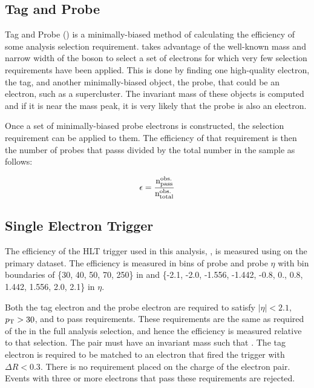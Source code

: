 \subsection{Tag and Probe}

Tag and Probe (\TnP) is a minimally-biased method of calculating the efficiency
of some analysis selection requirement. \TnP takes advantage of the well-known
mass and narrow width of the \Z boson to select a set of electrons for which
very few selection requirements have been applied. This is done by finding one
high-quality electron, the tag, and another minimally-biased object, the probe,
that could be an electron, such as a supercluster. The invariant mass of these
objects is computed and if it is near the \Z mass peak, it is very likely that
the probe is also an electron.

Once a set of minimally-biased probe electrons is constructed, the selection
requirement can be applied to them. The efficiency of that requirement is then
the number of probes that passs divided by the total number in the sample as
follows:

\begin{equation}
    \label{eq:eff}
    \epsilon = \frac{
        \text{n}^{\text{obs.}}_{\text{pass}}
    }{
        \text{n}^{\text{obs.}}_{\text{total}}
    }
\end{equation}

\subsection{Single Electron Trigger}
\label{ssec:sf_trigger}

The efficiency of the HLT trigger used in this analysis,
\SingleElectronTrigger, is measured using \TnP on the primary dataset. The
efficiency is measured in bins of probe \pt and probe $\eta$ with bin
boundaries of \{30, 40, 50, 70, 250\} in \pt and \{-2.1, -2.0, -1.556, -1.442,
-0.8, 0., 0.8, 1.442, 1.556, 2.0, 2.1\} in $\eta$.

Both the tag electron and the probe electron are required to satisfy $|\eta| <
2.1$, $p_{\mathrm{T}} > 30$, and to pass \EGTIGHT requirements. These requirements are the
same as required of the \CentralElectron in the full analysis selection, and
hence the efficiency is measured relative to that selection. The pair must have
an invariant mass such that \MassRange. The tag electron is required to be
matched to an electron that fired the trigger with $\Delta R < 0.3$. There is
no requirement placed on the charge of the electron pair. Events with three or
more electrons that pass these requirements are rejected.

